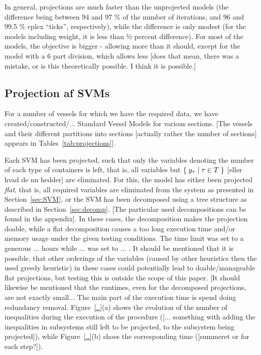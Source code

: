 In general, projections are much faster than the unprojected models (the difference being between 94 and 97 \% of the number of iterations, and 96 and 99.5 \% cplex ``ticks'', respectively), while the difference is only modest (for the models including weight, it is less than ½ percent difference). For most of the models, the objective is bigger - allowing more than it should, except for the model with a 6 part division, which allows less [does that mean, there was a mistake, or is this theoretically possible. I think it is possible.] 


\subsection*{Projection af SVMs}
For a number of vessels for which we have the required data, we have created/constructed/... Standard Vessel Models for various sections. [The vessels and their different partitions into sections [actually rather the number of sections] appears in Tables~\ref{tab:projections}]. 

Each SVM has been projected, such that only the variables denoting the number of each type of containers is left, that is, all variables but $\{\;{y_\tau}\;|\;{\tau\in T}\;\}$ [eller hvad de nu hedder] are eliminated. 
For this, the model has either been projected \emph{flat}, that is, all required variables are eliminated from the system as presented in Section~\ref{sec:SVM}, or the SVM has been decomposed using a tree structure as described in Section~\ref{sec:decomp}. [The particular used decompositions can be found in the appendix]. In these cases, the decomposition makes the projection doable, while a flat decomposition causes a too long execution time and/or memory usage under the given testing conditions. The time limit was set to a generous ... hours while ... was set to ... . 
It should be mentioned that it is possible, that other orderings of the variables (caused by other heuristics then the used greedy heuristic) in these cases could potentially lead to doable/manageable flat projections, but testing this is outside the scope of this paper.  
[It should likewise be mentioned that the runtimes, even for the decomposed projections, are not exactly small... The main part of the execution time is spend doing redundancy removal. Figure~\ref{..}(a) shows the evolution of the number of inequalities during the execution of the procedure ([... something with adding the inequalities in subsystems still left to be projected, to the subsystem being projected]), while Figure~\ref{..}(b) shoes the corresponding time ([summeret or for each step?]). 

